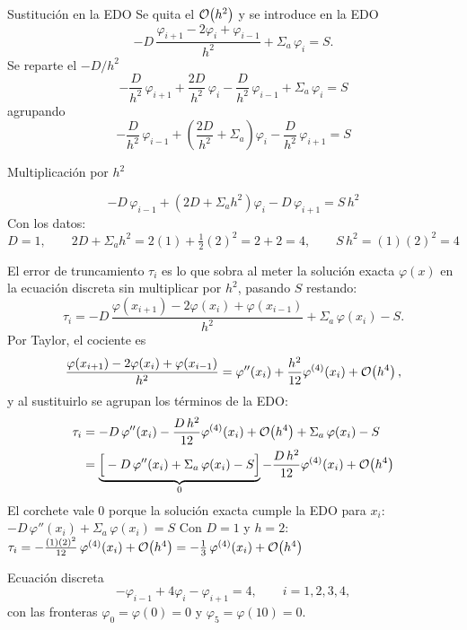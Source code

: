 Sustitución en la EDO
Se quita el $\mathcal{O}\!\left(h^2\right)$ y se introduce en la EDO
\[
-D\,\frac{\varphi_{i+1} - 2\varphi_i + \varphi_{i-1}}{h^2} + \Sigma_a\,\varphi_i = S .
\]
Se reparte el $-D/h^2$
\[
-\frac{D}{h^2}\,\varphi_{i+1} + \frac{2D}{h^2}\,\varphi_i - \frac{D}{h^2}\,\varphi_{i-1} + \Sigma_a\,\varphi_i = S
\]
agrupando
\[
-\frac{D}{h^2}\,\varphi_{i-1} + \left(\frac{2D}{h^2} + \Sigma_a\right)\varphi_i - \frac{D}{h^2}\,\varphi_{i+1} = S
\]

Multiplicación por $h^2$

\[
-D\,\varphi_{i-1} + \left(2D + \Sigma_a h^2\right)\varphi_i - D\,\varphi_{i+1} = S\,h^2 
\]
Con los datos:
\[
D = 1, \qquad
2D + \Sigma_a h^2 = 2(1) + \tfrac12(2)^2 = 2 + 2 = 4, \qquad
S\,h^2 = (1)(2)^2 = 4
\]


El error de truncamiento $\tau_i$ es lo que sobra al meter la solución exacta $\varphi(x)$ en la ecuación discreta sin multiplicar por $h^2$, pasando $S$ restando:
\[
\tau_i = -D\,\frac{\varphi(x_{i+1}) - 2\varphi(x_i) + \varphi(x_{i-1})}{h^2} + \Sigma_a\,\varphi(x_i) - S .
\]
Por Taylor, el cociente es
\[
\frac{\varphi(x_{i+1}) - 2\varphi(x_i) + \varphi(x_{i-1})}{h^2}
= \varphi''(x_i) + \frac{h^2}{12}\varphi^{(4)}(x_i) + \mathcal{O}\!\left(h^4\right),
\]
y al sustituirlo se agrupan los términos de la EDO:
\begin{align*}
	\tau_i
	&= -D\,\varphi''(x_i) - \frac{D\,h^2}{12}\varphi^{(4)}(x_i) + \mathcal{O}\!\left(h^4\right) + \Sigma_a\,\varphi(x_i) - S\\
	&= \underbrace{\Big[-D\,\varphi''(x_i) + \Sigma_a\,\varphi(x_i) - S\Big]}_{0}
	- \frac{D\,h^2}{12}\varphi^{(4)}(x_i) + \mathcal{O}\!\left(h^4\right)
\end{align*}
El corchete vale $0$ porque la solución exacta cumple la EDO para $x_i$: $-D\,\varphi''(x_i) + \Sigma_a\,\varphi(x_i) = S$
Con $D = 1$ y $h = 2$: $\tau_i = -\frac{(1)(2)^2}{12}\,\varphi^{(4)}(x_i) + \mathcal{O}\!\left(h^4\right) = -\frac13\,\varphi^{(4)}(x_i) + \mathcal{O}\!\left(h^4\right)$

Ecuación discreta
\[
-\varphi_{i-1} + 4\varphi_i - \varphi_{i+1} = 4, \qquad i = 1, 2, 3, 4,
\]
con las fronteras $\varphi_0 = \varphi(0) = 0$ y $\varphi_5 = \varphi(10) = 0$.

